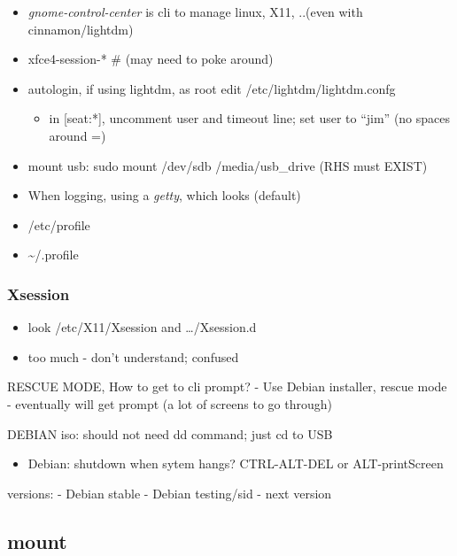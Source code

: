 \documentclass[
]{report}
\providecommand{\tightlist}{%
  \setlength{\itemsep}{0pt}\setlength{\parskip}{0pt}}\usepackage{longtable,booktabs,array}
\begin{document}
\begin{itemize}
\item
  \emph{gnome-control-center} is cli to manage linux, X11, ..(even with
  cinnamon/lightdm)
\item
  xfce4-session-* \# (may need to poke around)
\item
  autologin, if using lightdm, as root edit /etc/lightdm/lightdm.confg

  \begin{itemize}
  \tightlist
  \item
    in {[}seat:*{]}, uncomment user and timeout line; set user to
    ``jim'' (no spaces around =)
  \end{itemize}
\item
  mount usb: sudo mount /dev/sdb /media/usb\_drive (RHS must EXIST)
\item
  When logging, using a \emph{getty}, which looks (default)
\item
  /etc/profile
\item
  \textasciitilde/.profile
\end{itemize}

\subsubsection{Xsession}\label{xsession}

\begin{itemize}
\tightlist
\item
  look /etc/X11/Xsession and \ldots/Xsession.d
\item
  too much - don't understand; confused
\end{itemize}

RESCUE MODE, How to get to cli prompt? - Use Debian installer, rescue
mode - eventually will get prompt (a lot of screens to go through)

DEBIAN iso: should not need dd command; just cd to USB

\begin{itemize}
\tightlist
\item
  Debian: shutdown when sytem hangs? CTRL-ALT-DEL or ALT-printScreen
\end{itemize}

versions: - Debian stable - Debian testing/sid - next version

\subsection{mount}\label{mount}
\end{document}
